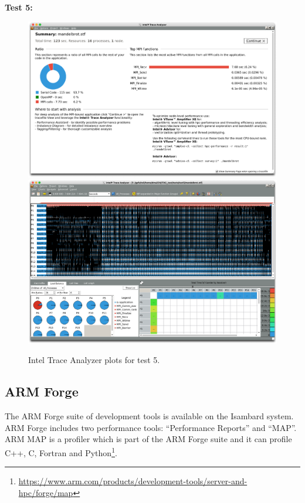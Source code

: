 \documentclass[a4paper,titlepage]{article}
\begin{document}
\noindent
\textbf{Test 5:}  
\begin{figure}[htbp]
\begin{center}
\includegraphics[scale=0.3]{figures/test5_summary}
\includegraphics[scale=0.3]{figures/test5_eventTimeline}
\caption{Intel Trace Analyzer plots for test 5.}
\label{fig:test5_ITAC_summary}
\end{center}
\end{figure}

\pagebreak

\subsection{ARM Forge}

The ARM Forge suite of development tools is available on the Isambard system. ARM Forge includes two performance tools: ``Performance Reports'' and ``MAP''. 
ARM MAP is a profiler which is part of the ARM Forge suite and it can profile C++, C, Fortran and Python\footnote{\url{https://www.arm.com/products/development-tools/server-and-hpc/forge/map}}.
\end{document}

